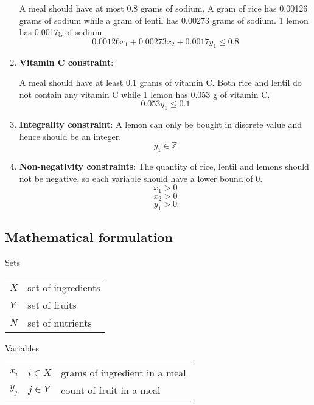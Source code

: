 \documentclass[
]{article}
\begin{document}
\begin{enumerate}
	      A meal should have at most 0.8 grams of sodium. A gram of rice has 0.00126 grams of sodium while a gram of lentil has 0.00273 grams of sodium.
	      1 lemon has 0.0017g of sodium.
	      \begin{equation}
	      	0.00126x_1 + 0.00273x_2 + 0.0017y_1 \le 0.8
	      \end{equation}
	\item \textbf{Vitamin C constraint}:
	      	      
	      A meal should have at least 0.1 grams of vitamin C. Both rice and lentil do not contain any vitamin C while 1 lemon has 0.053 g of vitamin C.
	      \begin{equation}
	      	0.053y_1 \le 0.1
	      \end{equation}
  \item \textbf{Integrality constraint}:
	      A lemon can only be bought in discrete value and hence should be an integer.
	      \begin{equation}
	      	y_1 \in \mathbb{Z}
	      \end{equation}
  \item \textbf{Non-negativity constraints}:
  The quantity of rice, lentil and lemons should not be negative, so each variable should have a lower bound of 0.
  \begin{equation}
    x_1 > 0
  \end{equation}
  \begin{equation}
    x_2 > 0
  \end{equation}
  \begin{equation}
    y_1 > 0
  \end{equation}
\end{enumerate}


\hypertarget{mathematical-formulation-1}{%
	\subsection{Mathematical formulation}\label{mathematical-formulation-1}}

Sets\\
\begin{tabular}{ll}
	$X$ & set of ingredients \\
	$Y$ & set of fruits      \\
	$N$ & set of nutrients   \\
\end{tabular}

Variables\\
\begin{tabular}{lll}
	$x_{i}$ & $i\in X$ & grams of ingredient in a meal \\
	$y_{j}$ & $j\in Y$ & count of fruit in a meal      
\end{tabular}
\setcounter{equation}{0}
\end{document}
